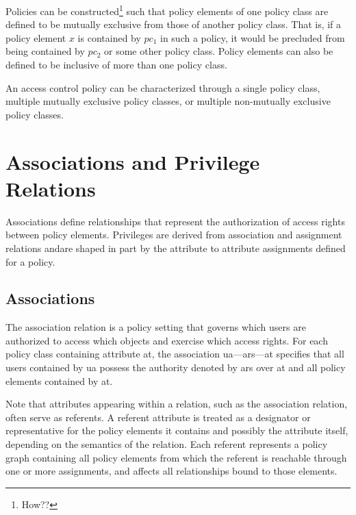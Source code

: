 \documentclass[12pt,a4paper,titlepage]{book}
\begin{document}
		Policies can be constructed\footnote{How??} such that policy elements of one policy class are defined to be mutually exclusive from those of another policy class. That is, if a policy element $ x $ is contained by $ pc_1 $ in such a policy, it would be precluded from being contained by $ pc_2 $ or some other policy class. Policy elements can also be defined to be inclusive of more than one policy class.
		
		An access control policy can be characterized through a single policy class, multiple mutually exclusive policy classes, or multiple non-mutually exclusive policy classes.
		
	\section{Associations and Privilege Relations}
	
	Associations define relationships that represent the authorization of access rights between policy elements. Privileges are derived from association and assignment relations andare shaped in part by the attribute to attribute assignments defined for a policy.
	
	\subsection{Associations}
	
		The association relation is a policy setting that governs which users are authorized to access which objects and exercise which access rights. For each policy class containing attribute at, the association ua—ars—at specifies that all users contained by ua possess the authority denoted by ars over at and all policy elements contained by at.
		
		Note that attributes appearing within a relation, such as the association relation, often serve as referents. A referent attribute is treated as a designator or representative for the policy elements it contains and possibly the attribute itself, depending on the semantics of the relation. Each referent represents a policy graph containing all policy elements from which the referent is reachable through one or more assignments, and affects all relationships bound to those elements.
		
\end{document}
